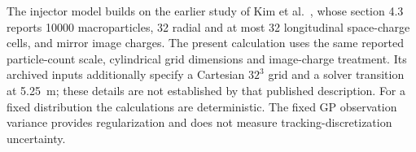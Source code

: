The injector model builds on the earlier study of Kim et al.~\cite{Kim2024KLSMOGA}, whose
section 4.3 reports \num{10000} macroparticles, 32 radial and at most 32 longitudinal
space-charge cells, and mirror image charges. The present calculation uses the same reported
particle-count scale, cylindrical grid dimensions and image-charge treatment. Its archived
inputs additionally specify a Cartesian \(32^3\) grid and a solver transition at
\SI{5.25}{\metre}; these details are not established by that published description.
For a fixed distribution the calculations are deterministic. The fixed GP observation variance
provides regularization and does not measure tracking-discretization uncertainty.
